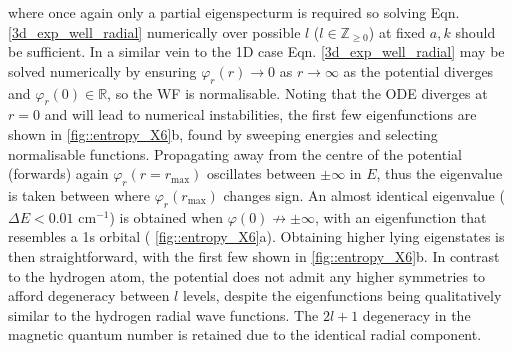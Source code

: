 \documentclass[../main.tex]{subfiles}
\begin{document}
where once again only a partial eigenspecturm is required so solving Eqn. \eqref{3d_exp_well_radial} numerically over possible $l$ ($l \in \mathbb{Z}_{\ge0}$) at fixed $a, k$ should be sufficient. In a similar vein to the 1D case Eqn. \eqref{3d_exp_well_radial} may be solved numerically by ensuring $\varphi_r(r) \rightarrow 0$ as $r \rightarrow \infty$ as the potential diverges and $\varphi_r(0) \in \mathbb{R}$, so the WF is normalisable. Noting that the ODE diverges at $r = 0$ and will lead to numerical instabilities, the first few eigenfunctions are shown in \figurename{ \ref{fig::entropy_X6}}b, found by sweeping energies and selecting normalisable functions. Propagating away from the centre of the potential (forwards) again $\varphi_r(r=r_\text{max})$ oscillates between $\pm \infty$ in $E$, thus the eigenvalue is taken between where $\varphi_r(r_\text{max})$ changes sign. An almost identical eigenvalue ($\Delta E < 0.01$ cm$^{-1}$) is obtained when $\varphi(0) \nrightarrow \pm \infty$, with an eigenfunction that resembles a 1s orbital (\figurename{ \ref{fig::entropy_X6}a}). Obtaining higher lying eigenstates is then straightforward, with the first few shown in  \figurename{ \ref{fig::entropy_X6}b}. In contrast to the hydrogen atom, the potential does not admit any higher symmetries to afford degeneracy between $l$ levels, despite the eigenfunctions being qualitatively similar to the hydrogen radial wave functions. The $2l + 1$ degeneracy in the magnetic quantum number is retained due to the identical radial component. 
\vspace{0.2cm}
\end{document}
